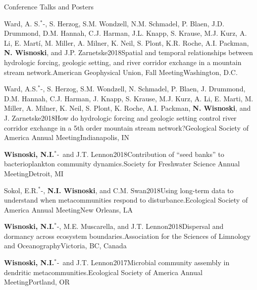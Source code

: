 \documentclass{resume} %
\newcommand{\Star}{\ensuremath{^*}\kern-\scriptspace}
\begin{document}
\begin{rhangSection}{Conference Talks and Posters}
   \begin{Presentation}{Ward, A. S.\Star, S. Herzog, S.M. Wondzell, N.M. Schmadel, P. Blaen, J.D. Drummond, D.M. Hannah, C.J. Harman, J.L. Knapp, S. Krause, M.J. Kurz, A. Li, E. Martí, M. Miller, A. Milner, K. Neil, S. Plont, K.R. Roche, A.I. Packman, {\bf N. Wisnoski}, and J.P. Zarnetske}{2018}{Spatial and temporal relationships between hydrologic forcing, geologic setting, and river corridor exchange in a mountain stream network.}{American Geophysical Union, Fall Meeting}{Washington, D.C.}
  \end{Presentation}
  
  \begin{Presentation}{Ward, A.S.\Star, S. Herzog, S.M. Wondzell, N. Schmadel, P. Blaen, J. Drummond, D.M. Hannah, C.J. Harman, J. Knapp, S. Krause, M.J. Kurz, A. Li, E. Marti, M. Miller, A. Milner, K. Neil, S. Plont, K. Roche, A.I. Packman, {\bf N. Wisnoski}, and J. Zarnetske}{2018}{How do hydrologic forcing and geologic setting control river corridor exchange in a 5th order mountain stream network?}{Geological Society of America Annual Meeting}{Indianapolis, IN}
  \end{Presentation}
  
  \begin{Presentation}{{\bf Wisnoski, N.I.}\Star\ and J.T. Lennon}{2018}{Contribution of \enquote{seed banks} to bacterioplankton community dynamics.}{Society for Freshwater Science Annual Meeting}{Detroit, MI}
  \end{Presentation}
  
  \begin{Presentation}{Sokol, E.R.\Star, {\bf N.I. Wisnoski}, and C.M. Swan}{2018}{Using long-term data to understand when metacommunities respond to disturbance.}{Ecological Society of America Annual Meeting}{New Orleans, LA}
  \end{Presentation}

  \begin{Presentation}{{\bf Wisnoski, N.I.}\Star, M.E. Muscarella, and J.T. Lennon}{2018}{Dispersal and dormancy across ecosystem boundaries.}{Association for the Sciences of Limnology and Oceanography}{Victoria, BC, Canada}
  \end{Presentation}

  \begin{Presentation}{{\bf Wisnoski, N.I.}\Star\ and J.T. Lennon}{2017}{Microbial community assembly in dendritic metacommunities.}{Ecological Society of America Annual Meeting}{Portland, OR}
  \end{Presentation}
  

\end{rhangSection}
\end{document}
